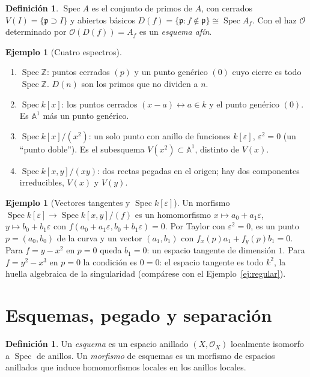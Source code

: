 \documentclass[11pt,a4paper,oneside]{book}
\newcommand{\Spec}{\operatorname{Spec}}
\newcommand{\A}{\mathbb{A}}
\newcommand{\ZZ}{\mathbb{Z}}
\newcommand{\cO}{\mathcal{O}}
\theoremstyle{plain}
\theoremstyle{definition}
\newtheorem{definicion}[teorema]{Definición}
\newtheorem{ejemplo}[teorema]{Ejemplo}
\theoremstyle{remark}
\begin{document}
\begin{definicion}
$\Spec A$ es el conjunto de primos de $A$, con cerrados $V(I)=\{\mathfrak p\supset I\}$ y abiertos básicos $D(f)=\{\mathfrak p: f\notin\mathfrak p\}\cong\Spec A_f$. Con el haz $\cO$ determinado por $\cO(D(f))=A_f$ es un \emph{esquema afín}.
\end{definicion}

\begin{ejemplo}[Cuatro espectros]\label{ej:spec}
\begin{enumerate}[label=(\alph*)]
\item $\Spec\ZZ$: puntos cerrados $(p)$ y un punto genérico $(0)$ cuyo cierre es todo $\Spec\ZZ$. $D(n)$ son los primos que no dividen a $n$.
\item $\Spec k[x]$: los puntos cerrados $(x-a)\leftrightarrow a\in k$ y el punto genérico $(0)$. Es $\A^1$ más un punto genérico.
\item $\Spec k[x]/(x^2)$: un solo punto con anillo de funciones $k[\varepsilon]$, $\varepsilon^2=0$ (un ``punto doble''). Es el subesquema $V(x^2)\subset\A^1$, distinto de $V(x)$.
\item $\Spec k[x,y]/(xy)$: dos rectas pegadas en el origen; hay dos componentes irreducibles, $V(x)$ y $V(y)$.
\end{enumerate}
\end{ejemplo}

\begin{ejemplo}[{Vectores tangentes y $\Spec k[\varepsilon]$}]\label{ej:tangente}
Un morfismo $\Spec k[\varepsilon]\to\Spec k[x,y]/(f)$ es un homomorfismo $x\mapsto a_0+a_1\varepsilon$, $y\mapsto b_0+b_1\varepsilon$ con $f(a_0+a_1\varepsilon,b_0+b_1\varepsilon)=0$. Por Taylor con $\varepsilon^2=0$, es un punto $p=(a_0,b_0)$ de la curva y un vector $(a_1,b_1)$ con $f_x(p)a_1+f_y(p)b_1=0$. Para $f=y-x^2$ en $p=0$ queda $b_1=0$: un espacio tangente de dimensión $1$. Para $f=y^2-x^3$ en $p=0$ la condición es $0=0$: el espacio tangente es todo $k^2$, la huella algebraica de la singularidad (compárese con el Ejemplo~\ref{ej:regular}).
\end{ejemplo}

\section{Esquemas, pegado y separación}

\begin{definicion}
Un \emph{esquema} es un espacio anillado $(X,\cO_X)$ localmente isomorfo a $\Spec$ de anillos. Un \emph{morfismo} de esquemas es un morfismo de espacios anillados que induce homomorfismos locales en los anillos locales.
\end{definicion}
\end{document}
